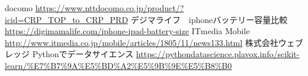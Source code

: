 \documentclass{jarticle}
\begin{document}
\begin{thebibliography}{99}
	 docomo \url{https://www.nttdocomo.co.jp/product/?icid=CRP_TOP_to_CRP_PRD}
	デジマライフ　iphoneバッテリー容量比較　\url{https://digimamalife.com/iphone-ipad-battery-size}
	 ITmedia Mobile \url{http://www.itmedia.co.jp/mobile/articles/1805/11/news133.html}
	 株式会社ウェブレッジ
	 Pythonでデータサイエンス \url{https://pythondatascience.plavox.info/scikit-learn/%E7%B7%9A%E5%BD%A2%E5%9B%9E%E5%B8%B0}
\end{thebibliography}
\end{document}
